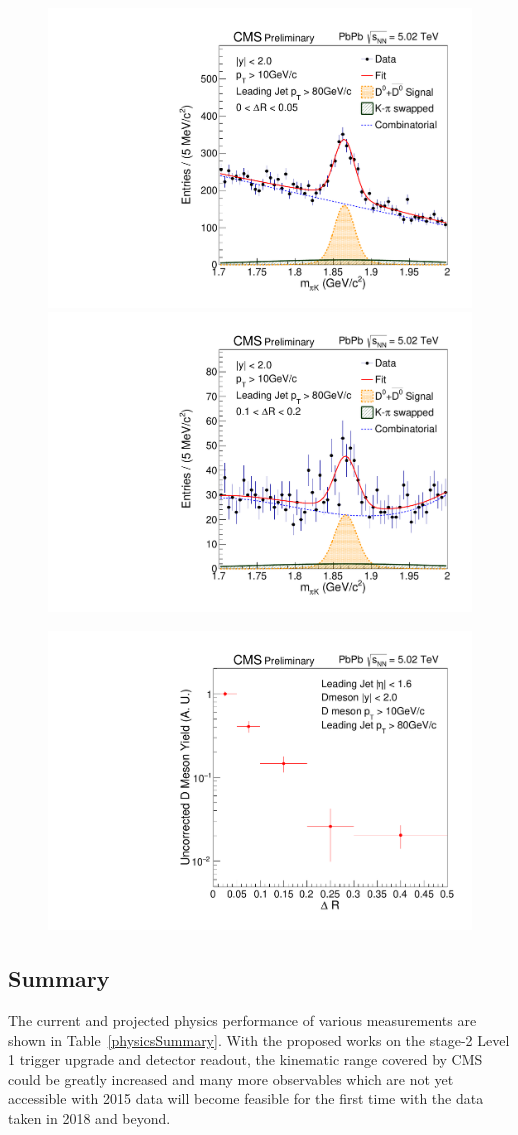 \begin{figure}[!ht]
\begin{center}
\includegraphics[width=.49\textwidth]{DJetPlots/fhHistoMass_R0.pdf}
\includegraphics[width=.49\textwidth]{DJetPlots/fhHistoMass_R2.pdf}
\caption{}
\label{fig:D0_Jet}
\end{center}
\end{figure}

\begin{figure}[!ht]
\begin{center}
\includegraphics[width=.49\textwidth]{DJetPlots/PrelimYield.pdf}
\caption{}
\label{fig:D0_JetYield}
\end{center}
\end{figure}


\subsection{Summary}

The current and projected physics performance of various measurements are shown in Table~\ref{physicsSummary}. With the proposed works on the stage-2 Level 1 trigger upgrade and detector readout, the kinematic range covered by CMS could be greatly increased and many more observables which are not yet accessible with 2015 data will become feasible for the first time with the data taken in 2018 and beyond.

